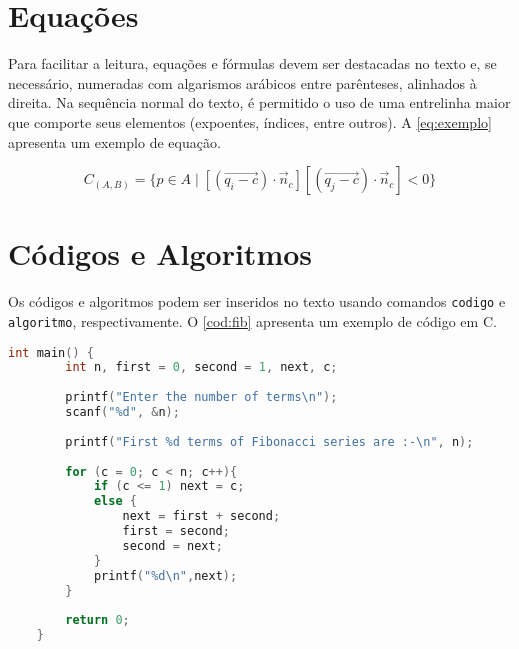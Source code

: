 \documentclass[12pt,oneside,a4paper,chapter=TITLE,section=TITLE,sumario=tradicional]{abntex2}
\begin{document}
\section{Equações}
\label{sec:equações}

Para facilitar a leitura, equações e fórmulas devem ser destacadas no texto e, 
se necessário, numeradas com algarismos arábicos entre parênteses, alinhados à 
direita. Na sequência normal do texto, é permitido o uso de uma entrelinha 
maior que comporte seus elementos (expoentes, índices, entre outros). A 
\autoref{eq:exemplo} apresenta um exemplo de equação.

\begin{equation}
\label{eq:exemplo}
C_{(A,B)} = \{ p \in
A\;|\;[(\overrightarrow{q_i-c}){\cdot}{\vec{n}}_c][(\overrightarrow{q_j-c}){\cdot}{\vec{n}}_c]
< 0 \}
\end{equation}

\section{Códigos e Algoritmos}
\label{sec:codigos}

Os códigos e algoritmos podem ser inseridos no texto usando comandos 
\texttt{codigo} e \texttt{algoritmo}, respectivamente. O \autoref{cod:fib} 
apresenta um exemplo de código em C.

\begin{codigo}[htb]
    \begin{lstlisting}[language=C]
    int main() {
        int n, first = 0, second = 1, next, c;
        
        printf("Enter the number of terms\n");
        scanf("%d", &n);
        
        printf("First %d terms of Fibonacci series are :-\n", n);
        
        for (c = 0; c < n; c++){
            if (c <= 1) next = c;
            else {
                next = first + second;
                first = second;
                second = next;
            }
            printf("%d\n",next);
        }
        
        return 0;
    }
    \end{lstlisting}
    
    \fonteautor
\end{codigo}
\end{document}
